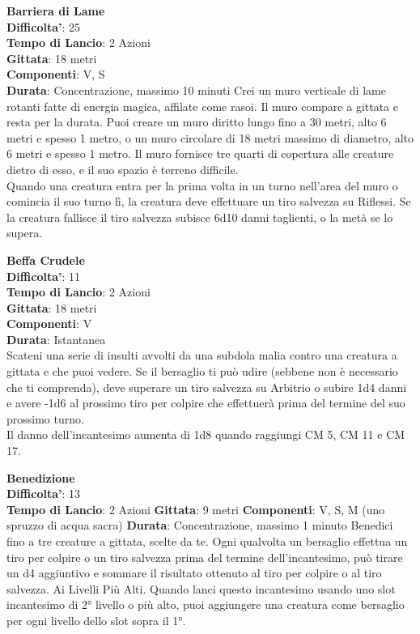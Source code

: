 \begin{multicols}{2}
\medskip\textbf{Barriera di Lame}\\
\textbf{Difficolta'}: 25\\
\textbf{Tempo di Lancio}: 2 Azioni\\
\textbf{Gittata}: 18 metri\\
\textbf{Componenti}: V, S\\
\textbf{Durata}: Concentrazione, massimo 10 minuti Crei un muro verticale di lame rotanti fatte di energia magica, affilate come rasoi. Il muro compare a gittata e resta per la durata. Puoi creare un muro diritto lungo fino a 30 metri, alto 6 metri e spesso 1 metro, o un muro circolare di 18 metri massimo di diametro, alto 6 metri e spesso 1 metro. Il muro fornisce tre quarti di copertura alle creature dietro di esso, e il suo spazio è terreno difficile. \\
Quando una creatura entra per la prima volta in un turno nell’area del muro o comincia il suo turno lì, la creatura deve effettuare un tiro salvezza su Riflessi. Se la creatura fallisce il tiro salvezza subisce 6d10 danni taglienti, o la metà se lo supera.

\medskip\textbf{Beffa Crudele}\\
\textbf{Difficolta'}: 11\\
\textbf{Tempo di Lancio}: 2 Azioni\\
\textbf{Gittata}: 18 metri\\
\textbf{Componenti}: V\\
\textbf{Durata}: Istantanea\\
Scateni una serie di insulti avvolti da una subdola malia contro una creatura a gittata e che puoi vedere. Se il bersaglio ti può udire (sebbene non è necessario che ti comprenda), deve superare un tiro salvezza su Arbitrio o subire 1d4 danni e avere -1d6 al prossimo tiro per colpire che effettuerà prima del termine del suo prossimo turno.\\
Il danno dell’incantesimo aumenta di 1d8 quando raggiungi CM 5, CM 11 e CM 17.

\medskip\textbf{Benedizione}\\
\textbf{Difficolta'}: 13\\
\textbf{Tempo di Lancio}: 2 Azioni
\textbf{Gittata}: 9 metri
\textbf{Componenti}: V, S, M (uno spruzzo di acqua sacra)
\textbf{Durata}: Concentrazione, massimo 1 minuto
Benedici fino a tre creature a gittata, scelte da te. Ogni
qualvolta un bersaglio effettua un tiro per colpire o un
tiro salvezza prima del termine dell’incantesimo, può
tirare un d4 aggiuntivo e sommare il risultato ottenuto al
tiro per colpire o al tiro salvezza.
Ai Livelli Più Alti. Quando lanci questo incantesimo
usando uno slot incantesimo di 2° livello o più alto, puoi
aggiungere una creatura come bersaglio per ogni livello
dello slot sopra il 1°.


\end{multicols}
